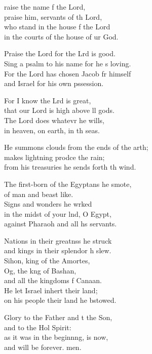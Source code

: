 \settowidth{\versewidth}{He summons clouds from the ends of the earth; +}
\begin{psalmverse}%
  \begin{patverse}
raise the name f the Lord,\Med\\
praise him, servants of th Lord,\\
who stand in the house f the Lord\Med\\
in the courts of the house of ur God.

Praise the Lord for the Lrd is good.\Med\\
Sing a psalm to his name for he \pointup{\i}s loving.\\
For the Lord has chosen Jacob fr himself\Med\\
and Israel for his own pssession.

For I know the Lrd is great,\Med\\
that our Lord is high above ll gods.\\
The Lord does whatevr he wills,\Med\\
in heaven, on earth, in th seas.

He summons clouds from the ends of the arth;\Flex\\
makes lightning prodce the rain;\Med\\
from his treasuries he sends forth th wind.

The first-born of the Egypt\pointup{\i}ans he smote,\Med\\
of man and beast like.\\
Signs and wonders he wrked\Flex\\
in the midst of your lnd, O Egypt,\Med\\
against Pharaoh and all h\pointup{\i}s servants.

Nations in their greatnss he struck\Med\\
and kings in their splendor h slew.\\
Sihon, king of the Amor\pointup{\i}tes,\Flex\\
Og, the k\pointup{\i}ng of Bashan,\Med\\
and all the kingdoms f Canaan.\\
He let Israel inher\pointup{\i}t their land;\Med\\
on his people their land he bstowed.

Glory to the Father and t the Son,\Med\\
and to the Hol Spirit:\\
as it was in the beginn\pointup{\i}ng, is now,\Med\\
and will be forever. men.
  \end{patverse}
\end{psalmverse}
